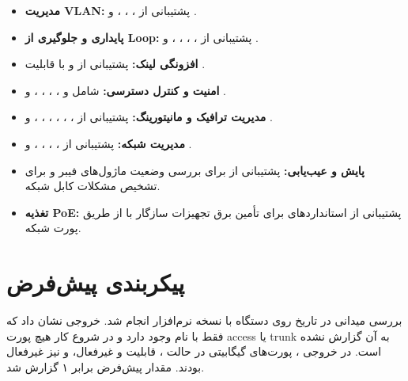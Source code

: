 \documentclass[11pt,letterpaper]{report}
\begin{document}
	\begin{itemize}
		\item \textbf{مدیریت VLAN:}
		پشتیبانی از ، ، ،
		 و .
		
		\item \textbf{پایداری و جلوگیری از Loop:}
		پشتیبانی از ، ، ،
		،  و .
		
		\item \textbf{افزونگی لینک:}
		پشتیبانی از  و  با قابلیت
		.
		
		\item \textbf{امنیت و کنترل دسترسی:}
		شامل  و ، ،
		، ،  و
		.
		
		\item \textbf{مدیریت ترافیک و مانیتورینگ:}
		پشتیبانی از ، ، ،
		، ، ،  و .
		
		\item \textbf{مدیریت شبکه:}
		پشتیبانی از ، ، ،
		،  و .
		
		\item \textbf{پایش و عیب‌یابی:}
		پشتیبانی از  برای بررسی وضعیت ماژول‌های فیبر
		و  برای تشخیص مشکلات کابل شبکه.
		
		\item \textbf{تغذیه PoE:}
		پشتیبانی از استانداردهای  برای تأمین برق
		تجهیزات سازگار با  از طریق پورت شبکه.
	\end{itemize}
	

	\section{پیکربندی پیش‌فرض}
	بررسی میدانی در تاریخ  روی دستگاه
	 با نسخه نرم‌افزار  انجام شد. خروجی
	 نشان داد که فقط  با نام  وجود
	دارد و در شروع کار هیچ پورت access یا trunk به آن گزارش نشده است.
	در خروجی ، پورت‌های گیگابیتی در حالت
	، قابلیت  و  غیرفعال، و
	 نیز غیرفعال بودند. مقدار پیش‌فرض  برابر ۱ گزارش شد.
\end{document}
